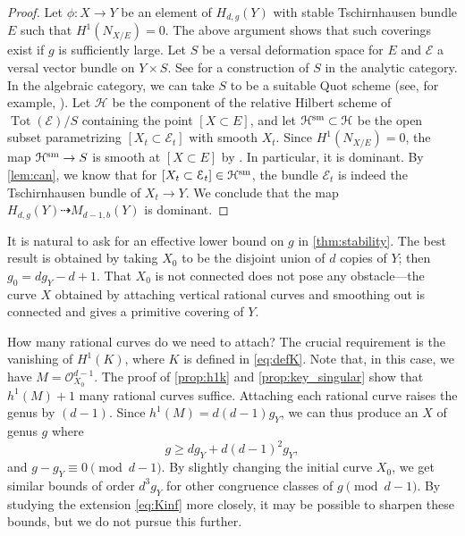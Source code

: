 \documentclass[11 pt]{amsart}
\DeclareMathOperator{\Tot}{Tot}
\renewcommand{\O}{{\mathcal O}}
\providecommand {\from}{{\colon}}
\numberwithin{equation}{section}
\begin{document}
\begin{proof}
  Let $\phi \from X \to Y$ be an element of $H_{d,g}(Y)$ with stable Tschirnhausen bundle $E$ such that $H^1(N_{X/E}) = 0$.
  The above argument shows that such coverings exist if $g$ is sufficiently large.
  Let $S$ be a versal deformation space for $E$ and $\mathcal E$ a versal vector bundle on $Y \times S$.
  See \cite[Lemma~2.1]{nar.ses:65} for a construction of $S$ in the analytic category.
  In the algebraic category, we can take $S$ to be a suitable Quot scheme (see, for example, \cite[Proposition~A.1]{hof:10}).
  Let $\mathcal H$ be the component of the relative Hilbert scheme of $\Tot(\mathcal E) / S$ containing the point $[X \subset E]$, and let $\mathcal H^{\rm sm} \subset \mathcal H$ be the open subset parametrizing $[X_t \subset \mathcal E_t]$ with smooth $X_t$.
  Since $H^1(N_{X/E}) = 0$, the map $\mathcal H^{\rm sm} \to S$ is smooth at $[X \subset E]$ by \cite[Theorem~3.2.12]{ser:06}.
  In particular, it is dominant.
  By \autoref{lem:can}, we know that for $[X_t \subset \mathcal E_t] \in \mathcal H^{\rm sm}$, the bundle $\mathcal E_t$ is indeed the Tschirnhausen bundle of $X_t \to Y$.
  We conclude that the map $H_{d,g}(Y) \dashrightarrow M_{d-1,b}(Y)$ is dominant.
\end{proof}

\begin{remark}
  It is natural to ask for an effective lower bound on $g$ in \autoref{thm:stability}.
  The best result is obtained by taking $X_0$ to be the disjoint union of $d$ copies of $Y$; then $g_0 = dg_Y - d + 1$.
  That $X_0$ is not connected does not pose any obstacle---the curve $X$ obtained by attaching vertical rational curves and smoothing out is connected and gives a primitive covering of $Y$.

  How many rational curves do we need to attach?
  The crucial requirement is the vanishing of $H^1(K)$, where $K$ is defined in \eqref{eq:defK}.
  Note that, in this case, we have $M = \O_{X_0}^{d-1}$.
  The proof of \autoref{prop:h1k} and \autoref{prop:key_singular} show that $h^1(M)+1$ many rational curves suffice.
  Attaching each rational curve raises the genus by $(d-1)$.
  Since $h^1(M) = d(d-1)g_Y$, we can thus produce an $X$ of genus $g$ where
  \[g \geq dg_Y + d(d-1)^2g_Y,\]
  and $g - g_Y \equiv 0 \pmod {d-1}$.
  By slightly changing the initial curve $X_0$, we get similar bounds of order $d^3g_Y$ for other congruence classes of $g \pmod {d-1}$.
  By studying the extension \eqref{eq:Kinf} more closely, it may be possible to sharpen these bounds, but we do not pursue this further.
\end{remark}
\end{document}

